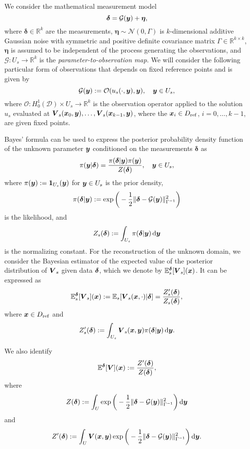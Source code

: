 \documentclass[graybox]{svmult}
\begin{document}
We consider the mathematical measurement model
\begin{equation}\label{delta}
    \boldsymbol\delta=\mathcal G({\boldsymbol{y}})+\boldsymbol\eta,
\end{equation}
where $\boldsymbol\delta\in\mathbb R^k$ are the measurements, $\boldsymbol\eta\sim\mathcal N(0,\Gamma)$ is $k$-dimensional additive Gaussian noise with symmetric and positive definite covariance matrix $\Gamma\in\mathbb R^{k\times k}$, $\boldsymbol\eta$ is assumed to be independent of the process generating the observations, and $\mathcal G\!:U_s\to\mathbb R^k$ is the \emph{parameter-to-observation map}. We will consider the following particular form of observations that depends on fixed reference points and is given by
\begin{equation}\label{observationOperator}
    \mathcal G({\boldsymbol{y}}):={\mathcal{O}}(u_s(\cdot,{\boldsymbol{y}}), {\boldsymbol{y}}),\quad {\boldsymbol{y}}\in U_s,
\end{equation}
where
$\mathcal O\!:H_0^1(\mathscr D)\times U_s\to\mathbb R^k$ is the observation operator applied to the solution $u_s$ evaluated at $\boldsymbol V_s({\boldsymbol{x}}_0, {\boldsymbol{y}}), \dots, \boldsymbol V_s({\boldsymbol{x}}_{k-1}, {\boldsymbol{y}})$, where the ${\boldsymbol{x}}_i \in D_{\rm ref}$, $i = 0, \dots, k-1$, are given fixed points. 

Bayes' formula can be used to express the posterior probability density function of the unknown parameter ${\boldsymbol{y}}$ conditioned on the measurements $\boldsymbol\delta$ as
$$
\pi({\boldsymbol{y}}|\boldsymbol\delta)=\frac{\pi(\boldsymbol\delta|{\boldsymbol{y}})\pi({\boldsymbol{y}})}{Z(\boldsymbol\delta)},\quad{\boldsymbol{y}}\in U_s,
$$
where $\pi({\boldsymbol{y}}):=\mathbf 1_{U_s}({\boldsymbol{y}})$ for ${\boldsymbol{y}}\in U_s$ is the prior density, 
$$
\pi(\boldsymbol\delta|{\boldsymbol{y}}):=\exp\bigg(-\frac12 \|\boldsymbol\delta-\mathcal G({\boldsymbol{y}})\|_{\Gamma^{-1}}^2\bigg)
$$
is the likelihood, and
$$
Z_s(\boldsymbol\delta):=\int_{U_s}\pi(\boldsymbol\delta|{\boldsymbol{y}})\,{\rm d}{\boldsymbol{y}}
$$
is the normalizing constant. For the reconstruction of the unknown domain, we consider the Bayesian estimator of the expected value of the posterior distribution of ${\boldsymbol{V}}_s$ given data ${\boldsymbol{\delta}}$, which we denote by $\mathbb{E}_s^{{\boldsymbol{\delta}}}[{\boldsymbol{V}}_s]({\boldsymbol{x}})$. It can be expressed as
$$
\mathbb{E}_s^{{\boldsymbol{\delta}}}[{\boldsymbol{V}}_s]({\boldsymbol{x}}):=\mathbb E_s[\boldsymbol V_s({\boldsymbol{x}},\cdot)|\boldsymbol\delta]=\frac{Z_s'(\boldsymbol\delta)}{Z_s(\boldsymbol\delta)},
$$
where ${\boldsymbol{x}} \in D_{\rm ref}$ and
$$
Z_s'(\boldsymbol\delta):=\int_{U_s} \boldsymbol V_s({\boldsymbol{x}},{\boldsymbol{y}})\pi(\boldsymbol\delta|{\boldsymbol{y}})\,{\rm d}{\boldsymbol{y}}.
$$

We also identify $$\mathbb E^{\boldsymbol\delta}[\boldsymbol V]({\boldsymbol{x}}):=\frac{Z'(\boldsymbol\delta)}{Z(\boldsymbol \delta)},$$ where
$$
Z(\boldsymbol\delta):=\int_U \exp\bigg(-\frac12 \|\boldsymbol\delta-\mathcal G({\boldsymbol{y}})\|_{\Gamma^{-1}}^2\bigg)\,{\rm d}{\boldsymbol{y}}
$$
and
$$
Z'(\boldsymbol\delta):=\int_U \boldsymbol V({\boldsymbol{x}},{\boldsymbol{y}})\exp\bigg(-\frac12 \|\boldsymbol\delta-\mathcal G({\boldsymbol{y}})\|_{\Gamma^{-1}}^2\bigg)\,{\rm d}{\boldsymbol{y}}.
$$
\end{document}

